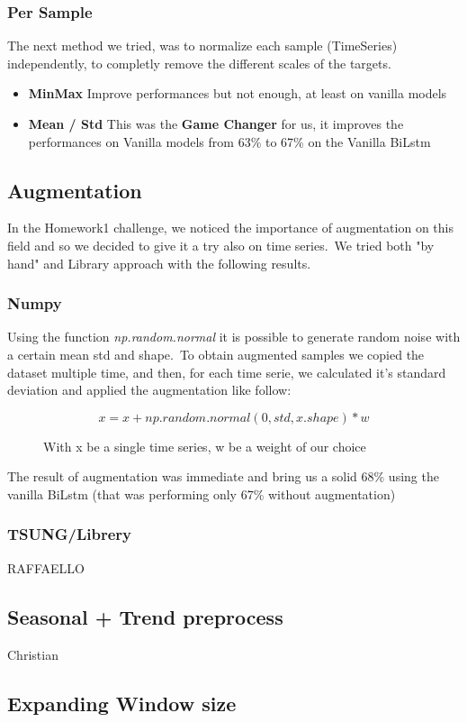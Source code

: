 \documentclass[11pt]{article}
\begin{document}
\subsubsection{Per Sample}
The next method we tried, was to normalize each sample (TimeSeries) independently, to completly remove the different scales of the targets.
\begin{itemize}
  \item \textbf{MinMax} Improve performances but not enough, at least on vanilla models
  \item \textbf{Mean / Std} This was the \textbf{Game Changer} for us, it improves the performances on Vanilla models from 63\% to 67\% on the Vanilla BiLstm
\end{itemize}
\subsection{Augmentation}
In the Homework1 challenge, we noticed the importance of augmentation on this field and so we decided to give it a try also on time series.\
We tried both "by hand" and Library approach with the following results.
\subsubsection{Numpy}
Using the function \textit{np.random.normal} it is possible to generate random noise with a certain mean std and shape.\
To obtain augmented samples we copied the dataset multiple time, and then, for each time serie, we calculated it's standard deviation and applied the augmentation like follow:

\begin{figure}[h]
  \[ x = x + np.random.normal(0,std,x.shape) * w\]
  \caption{With x be a single time series, w be a weight of our choice}
\end{figure}

The result of augmentation was immediate and bring us a solid 68\% using the vanilla BiLstm (that was performing only 67\% without augmentation)
\subsubsection{TSUNG/Librery}
 RAFFAELLO
\subsection{Seasonal + Trend preprocess}
Christian
\subsection{Expanding Window size}
\end{document}
